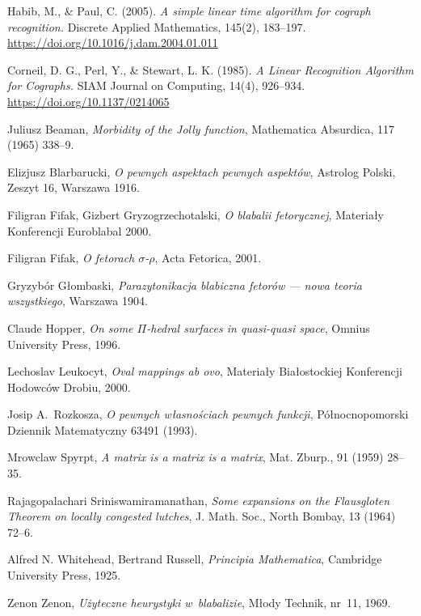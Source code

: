 \documentclass[licencjacka,en]{pracamgr}
\begin{document}
\begin{thebibliography}{99}

   Habib, M., \& Paul, C. (2005). \textit{A simple linear time algorithm for cograph recognition.} Discrete Applied Mathematics, 145(2), 183–197. \url{https://doi.org/10.1016/j.dam.2004.01.011}

   Corneil, D. G., Perl, Y., \& Stewart, L. K. (1985). \textit{A Linear Recognition Algorithm for Cographs.} SIAM Journal on Computing, 14(4), 926–934. \url{https://doi.org/10.1137/0214065}

   Juliusz Beaman, \textit{Morbidity of the Jolly
    function}, Mathematica Absurdica, 117 (1965) 338--9.

   Elizjusz Blarbarucki, \textit{O pewnych
    aspektach pewnych aspektów}, Astrolog Polski, Zeszyt 16, Warszawa
  1916.

   Filigran Fifak, Gizbert Gryzogrzechotalski,
  \textit{O blabalii fetorycznej}, Materiały Konferencji Euroblabal
  2000.

   Filigran Fifak, \textit{O fetorach
    $\sigma$-$\rho$}, Acta Fetorica, 2001.

   Gryzybór Głombaski, \textit{Parazytonikacja
    blabiczna fetorów --- nowa teoria wszystkiego}, Warszawa 1904.

   Claude Hopper, \textit{On some $\Pi$-hedral
    surfaces in quasi-quasi space}, Omnius University Press, 1996.

   Lechoslav Leukocyt, \textit{Oval mappings ab ovo},
  Materiały Białostockiej Konferencji Hodowców Drobiu, 2000.

   Josip A.~Rozkosza, \textit{O pewnych własnościach
    pewnych funkcji}, Północnopomorski Dziennik Matematyczny 63491
  (1993).

   Mrowclaw Spyrpt, \textit{A matrix is a matrix
    is a matrix}, Mat. Zburp., 91 (1959) 28--35.

   Rajagopalachari Sriniswamiramanathan,
  \textit{Some expansions on the Flausgloten Theorem on locally
    congested lutches}, J. Math.  Soc., North Bombay, 13 (1964) 72--6.

   Alfred N. Whitehead, Bertrand Russell,
  \textit{Principia Mathematica}, Cambridge University Press, 1925.

   Zenon Zenon, \textit{Użyteczne heurystyki
    w~blabalizie}, Młody Technik, nr~11, 1969.

\end{thebibliography}
\end{document}
